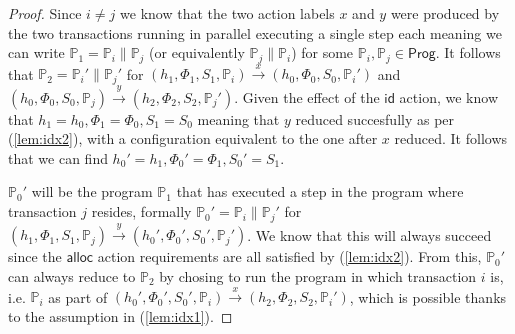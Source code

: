 \begin{lem}
\begin{proof}
	Since $i \neq j$ we know that the two action labels $x$ and $y$ were produced by the two transactions running in parallel executing a single step each meaning we can write $\mathds{P}_1 = \mathds{P}_i \| \mathds{P}_j$ (or equivalently $\mathds{P}_j \| \mathds{P}_i$) for some $\mathds{P}_i, \mathds{P}_j \in \mathsf{Prog}$. It follows that $\mathds{P}_2 = \mathds{P}_i' \| \mathds{P}_j'$ for $(h_1, \Phi_1, S_1, \mathds{P}_i) \xrightarrow{x} (h_0, \Phi_0, S_0, \mathds{P}_i')$ and $(h_0, \Phi_0, S_0, \mathds{P}_j) \xrightarrow{y} (h_2, \Phi_2, S_2, \mathds{P}_j')$. Given the effect of the $\mathsf{id}$ action, we know that $h_1 = h_0, \Phi_1 = \Phi_0, S_1 = S_0$ meaning that $y$ reduced succesfully as per (\ref{lem:idx2}), with a configuration equivalent to the one after $x$ reduced. It follows that we can find $h_0' = h_1, \Phi_0' = \Phi_1, S_0' = S_1$.
	
	$\mathds{P}_0'$ will be the program $\mathds{P}_1$ that has executed a step in the program where transaction $j$ resides, formally $\mathds{P}_0' = \mathds{P}_i \| \mathds{P}_j'$ for $(h_1, \Phi_1, S_1, \mathds{P}_j) \xrightarrow{y} (h_0', \Phi_0', S_0', \mathds{P}_j')$. We know that this will always succeed since the $\mathsf{alloc}$ action requirements are all satisfied by (\ref{lem:idx2}). From this, $\mathds{P}_0'$ can always reduce to $\mathds{P}_2$ by chosing to run the program in which transaction $i$ is, i.e. $\mathds{P}_i$ as part of $(h_0', \Phi_0', S_0', \mathds{P}_i) \xrightarrow{x} (h_2, \Phi_2, S_2, \mathds{P}_i')$, which is possible thanks to the assumption in (\ref{lem:idx1}).
	\end{proof}
\end{lem}

